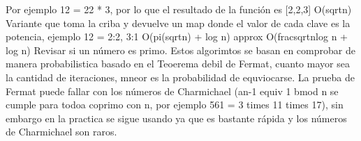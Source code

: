 {}Por ejemplo \markdownRendererDollarSign{}12 = 2\markdownRendererCircumflex{}2 * 3\markdownRendererDollarSign{}, por lo que el resultado de la función es \markdownRendererDollarSign{}[2,2,3]\markdownRendererDollarSign{}\markdownRendererParagraphSeparator
{} \markdownRendererDollarSign{}O(\markdownRendererBackslash{}sqrt\markdownRendererLeftBrace{}n\markdownRendererRightBrace{})\markdownRendererDollarSign{}\markdownRendererInterblockSeparator
{}\markdownRendererInterblockSeparator
{}Variante que toma la criba y devuelve un map donde el valor de cada clave es la potencia, ejemplo\markdownRendererSoftLineBreak
{}\markdownRendererDollarSign{}12 = \markdownRendererLeftBrace{}2:2, 3:1\markdownRendererRightBrace{}\markdownRendererDollarSign{}\markdownRendererParagraphSeparator
{} \markdownRendererDollarSign{}O(\markdownRendererBackslash{}pi(\markdownRendererBackslash{}sqrt\markdownRendererLeftBrace{}n\markdownRendererRightBrace{}) + \markdownRendererBackslash{}log n) \markdownRendererBackslash{}approx O(\markdownRendererBackslash{}frac\markdownRendererLeftBrace{}\markdownRendererBackslash{}sqrt\markdownRendererLeftBrace{}n\markdownRendererRightBrace{}\markdownRendererRightBrace{}\markdownRendererLeftBrace{}\markdownRendererBackslash{}log n\markdownRendererRightBrace{} + \markdownRendererBackslash{}log n)\markdownRendererDollarSign{}\markdownRendererInterblockSeparator
{}\markdownRendererInterblockSeparator
{}
\markdownRendererSectionEnd 
\markdownRendererSectionEnd \markdownRendererSectionBegin
{}\markdownRendererInterblockSeparator
{}Revisar si un número es primo.\markdownRendererInterblockSeparator
{}\markdownRendererInterblockSeparator
{}\markdownRendererSectionBegin
{}\markdownRendererInterblockSeparator
{}Estos algorimtos se basan en comprobar de manera probabilistica basado en el Teoerema debil de Fermat, cuanto mayor sea la cantidad de iteraciones, mneor es la probabilidad de equviocarse.\markdownRendererInterblockSeparator
{}\markdownRendererSectionBegin
{}\markdownRendererInterblockSeparator
{}La prueba de Fermat puede fallar con los números de Charmichael  (\markdownRendererDollarSign{}a\markdownRendererCircumflex{}\markdownRendererLeftBrace{}n-1\markdownRendererRightBrace{} \markdownRendererBackslash{}equiv 1 \markdownRendererBackslash{}bmod n\markdownRendererDollarSign{} se cumple para todo\markdownRendererDollarSign{}a\markdownRendererDollarSign{} coprimo con \markdownRendererDollarSign{}n\markdownRendererDollarSign{}, por ejemplo \markdownRendererDollarSign{}561 = 3 \markdownRendererBackslash{}times 11 \markdownRendererBackslash{}times 17\markdownRendererDollarSign{}), sin embargo en la practica se sigue usando ya que es bastante rápida y los números de Charmichael son raros.\markdownRendererInterblockSeparator

